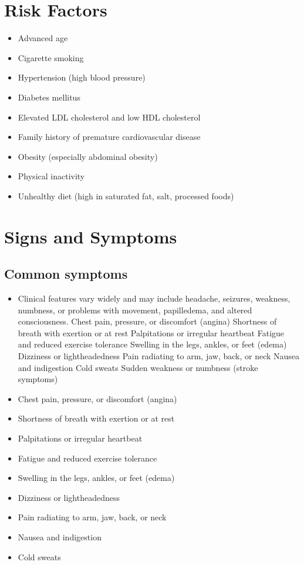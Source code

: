 \section{Risk Factors}

\begin{itemize}[noitemsep]
  \item Advanced age
  \item Cigarette smoking
  \item Hypertension (high blood pressure)
  \item Diabetes mellitus
  \item Elevated LDL cholesterol and low HDL cholesterol
  \item Family history of premature cardiovascular disease
  \item Obesity (especially abdominal obesity)
  \item Physical inactivity
  \item Unhealthy diet (high in saturated fat, salt, processed foods)
\end{itemize}
\section{Signs and Symptoms}

\subsection{Common symptoms}
\begin{itemize}[noitemsep]
  \item Clinical features vary widely and may include headache, seizures, weakness, numbness, or problems with movement, papilledema, and altered consciousness. Chest pain, pressure, or discomfort (angina) Shortness of breath with exertion or at rest Palpitations or irregular heartbeat Fatigue and reduced exercise tolerance Swelling in the legs, ankles, or feet (edema) Dizziness or lightheadedness Pain radiating to arm, jaw, back, or neck Nausea and indigestion Cold sweats Sudden weakness or numbness (stroke symptoms)
  \item Chest pain, pressure, or discomfort (angina)
  \item Shortness of breath with exertion or at rest
  \item Palpitations or irregular heartbeat
  \item Fatigue and reduced exercise tolerance
  \item Swelling in the legs, ankles, or feet (edema)
  \item Dizziness or lightheadedness
  \item Pain radiating to arm, jaw, back, or neck
  \item Nausea and indigestion
  \item Cold sweats
\end{itemize}

